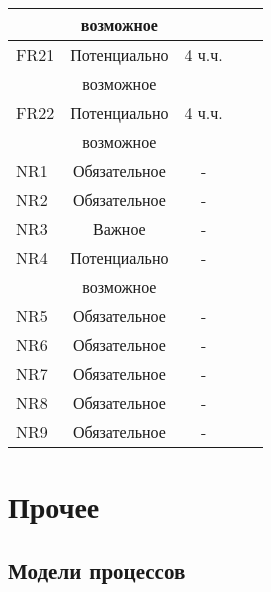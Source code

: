 \begin{longtable}{|l|c|c|c|c|}
         & возможное    &         & & \\ \hline
    FR21 & Потенциально &  4 ч.ч. & & \\
         & возможное    &         & & \\ \hline
    FR22 & Потенциально &  4 ч.ч. & & \\
         & возможное    &         & & \\ \hline
    NR1  & Обязательное & -       & & \\ \hline
    NR2  & Обязательное & -       & & \\ \hline
    NR3  & Важное       & -       & & \\ \hline
    NR4  & Потенциально & -       & & \\
         & возможное    &         & & \\ \hline
    NR5  & Обязательное & -       & & \\ \hline
    NR6  & Обязательное & -       & & \\ \hline
    NR7  & Обязательное & -       & & \\ \hline
    NR8  & Обязательное & -       & & \\ \hline
    NR9  & Обязательное & -       & & \\ \hline
\end{longtable}

\section{Прочее}
\subsection{Модели процессов}
